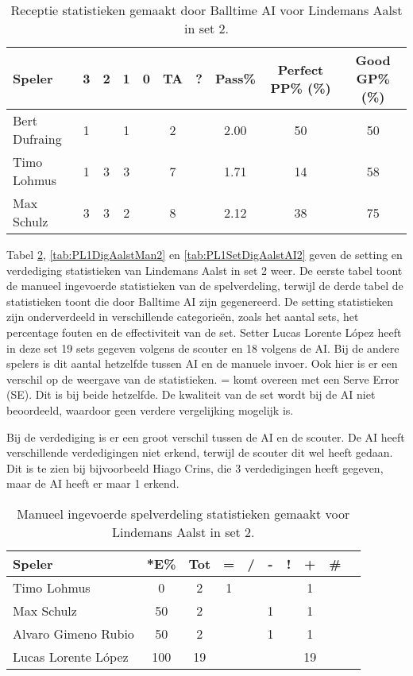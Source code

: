 \begin{table}[ht!]
  \centering
  \scriptsize
  \begin{tabular}{|l|c|c|c|c|c|c|c|c|c|} \hline
    \textbf{Speler} & 3 & 2 & 1 & 0 & TA & ? & Pass\% & Perfect PP\% (\%) & Good GP\% (\%) \\ \hline
    Bert Dufraing & 1 &  & 1 &  & 2 &  & 2.00 & 50 & 50 \\
    Timo Lohmus & 1 & 3 & 3 &  & 7 &  & 1.71 & 14 & 58 \\
    Max Schulz & 3 & 3 & 2 &  & 8 &  & 2.12 & 38 & 75 \\  \hline
  \end{tabular}
  \caption[Receptie statistieken gemaakt door Balltime AI voor Lindemans Aalst in set 2]{\label{tab:PL1ReceiveAalstAI2}Receptie statistieken gemaakt door Balltime AI voor Lindemans Aalst in set 2.}
\end{table}

Tabel \ref{tab:PL1SetAalstMan2}, \ref{tab:PL1DigAalstMan2} en \ref{tab:PL1SetDigAalstAI2} geven de setting en verdediging statistieken van Lindemans Aalst in set 2 weer. De eerste tabel toont de manueel ingevoerde statistieken van de spelverdeling, terwijl de derde tabel de statistieken toont die door Balltime AI zijn gegenereerd. De setting statistieken zijn onderverdeeld in verschillende categorieën, zoals het aantal sets, het percentage fouten en de effectiviteit van de set. Setter Lucas Lorente López heeft in deze set 19 sets gegeven volgens de scouter en 18 volgens de AI. Bij de andere spelers is dit aantal hetzelfde tussen AI en de manuele invoer. Ook hier is er een verschil op de weergave van de statistieken. = komt overeen met een Serve Error (SE). Dit is bij beide hetzelfde. De kwaliteit van de set wordt bij de AI niet beoordeeld, waardoor geen verdere vergelijking mogelijk is.

Bij de verdediging is er een groot verschil tussen de AI en de scouter. De AI heeft verschillende verdedigingen niet erkend, terwijl de scouter dit wel heeft gedaan. Dit is te zien bij bijvoorbeeld Hiago Crins, die 3 verdedigingen heeft gegeven, maar de AI heeft er maar 1 erkend.

\begin{table}[ht!]
  \centering
  \scriptsize
    \begin{tabular}{|l|c|c|c|c|c|c|c|c|c|} \hline
      \textbf{Speler} & *E\% & Tot & = & / & - & ! & + & \# \\ \hline
      Timo Lohmus & 0 & 2 & 1 &  &  &  & 1 &   \\
      Max Schulz & 50 & 2 &  &  & 1 & & 1 &  \\
      Alvaro Gimeno Rubio  & 50 & 2 &  &  & 1 &  & 1 &   \\ 
      Lucas Lorente López  & 100 & 19 &  &  &  &  & 19 &  \\ \hline
  \end{tabular}
  \caption[Manueel ingevoerde spelverdeling statistieken gemaakt voor Lindemans Aalst in set 2]{\label{tab:PL1SetAalstMan2}Manueel ingevoerde spelverdeling statistieken gemaakt voor Lindemans Aalst in set 2.}
\end{table}

